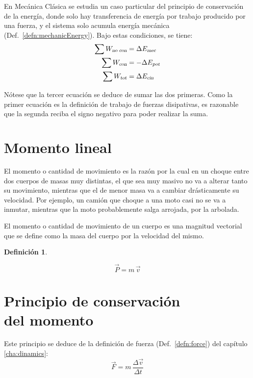 \documentclass[a5paper,12pt,twoside]{book}
\newtheorem{defn}{{Definición}}[chapter]
\begin{document}
En Mecánica Clásica se estudia un caso particular del principio de conservación de la energía, donde solo hay transferencia de energía por trabajo producido por una fuerza, y el sistema solo acumula energía mecánica (Def.\ \ref{defn:mechanicEnergy}).
Bajo estas condiciones, se tiene:
\begin{align*}
    \sum {{W}_\textsl{{no con}}} &= \Delta {{E}_\textsl{{mec}}}
    \\
    \sum {{W}_\textsl{{con}}} &= - \Delta {{E}_\textsl{{pot}}}
    \\
    \sum {{W}_\textsl{{tot}}} &= \Delta {{E}_\textsl{{cin}}}
\end{align*}

Nótese que la tercer ecuación se deduce de sumar las dos primeras.
Como la primer ecuación es la definición de trabajo de fuerzas disipativas, es razonable que la segunda reciba el signo negativo para poder realizar la suma.


\section{Momento lineal}

El momento o cantidad de movimiento es la razón por la cual en un choque entre dos cuerpos de masas muy distintas, el que sea muy masivo no va a alterar tanto su movimiento, mientras que el de menor masa va a cambiar drásticamente su velocidad.
Por ejemplo, un camión que choque a una moto casi no se va a inmutar, mientras que la moto probablemente salga arrojada, por la arbolada.

El momento o cantidad de movimiento de un cuerpo es una magnitud vectorial que se define como la masa del cuerpo por la velocidad del mismo.

\begin{mdframed}[style=MyFrame1]
    \begin{defn}
        \label{defn:momentum}
    \end{defn}
    \begin{equation*}
        \Vec{P} = m \, \Vec{v}
    \end{equation*}
\end{mdframed}


\section[Principio de conservación del momento]{Principio de conservación \\ del momento}

Este principio se deduce de la definición de fuerza (Def.\ \ref{defn:force}) del capítulo \ref{cha:dinamics}:
\[ \Vec{F} = m \, \frac{\Delta \Vec{v}}{\Delta t} \]
\end{document}

